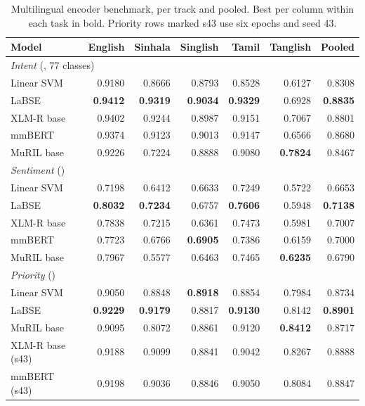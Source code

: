 \begin{table}[!htbp]
\caption{Multilingual encoder benchmark, per track and pooled. Best per column
within each task in bold. Priority rows marked s43 use six epochs and seed 43.}
\label{tab:encoder_benchmark}
\centering
\scriptsize
\setlength{\tabcolsep}{3.2pt}
\begin{tabular}{@{}lrrrrrr@{}}
\toprule
Model & English & Sinhala & Singlish & Tamil & Tanglish & Pooled \\
\midrule
\multicolumn{7}{l}{\textit{Intent} (\macrof{}, 77 classes)} \\
Linear SVM & 0.9180 & 0.8666 & 0.8793 & 0.8528 & 0.6127 & 0.8308 \\
LaBSE      & \textbf{0.9412} & \textbf{0.9319} & \textbf{0.9034} & \textbf{0.9329} & 0.6928 & \textbf{0.8835} \\
XLM-R base & 0.9402 & 0.9244 & 0.8987 & 0.9151 & 0.7067 & 0.8801 \\
mmBERT     & 0.9374 & 0.9123 & 0.9013 & 0.9147 & 0.6566 & 0.8680 \\
MuRIL base & 0.9226 & 0.7224 & 0.8888 & 0.9080 & \textbf{0.7824} & 0.8467 \\
\midrule
\multicolumn{7}{l}{\textit{Sentiment} (\negf{})} \\
Linear SVM & 0.7198 & 0.6412 & 0.6633 & 0.7249 & 0.5722 & 0.6653 \\
LaBSE      & \textbf{0.8032} & \textbf{0.7234} & 0.6757 & \textbf{0.7606} & 0.5948 & \textbf{0.7138} \\
XLM-R base & 0.7838 & 0.7215 & 0.6361 & 0.7473 & 0.5981 & 0.7007 \\
mmBERT     & 0.7723 & 0.6766 & \textbf{0.6905} & 0.7386 & 0.6159 & 0.7000 \\
MuRIL base & 0.7967 & 0.5577 & 0.6463 & 0.7465 & \textbf{0.6235} & 0.6790 \\
\midrule
\multicolumn{7}{l}{\textit{Priority} (\macrof{})} \\
Linear SVM & 0.9050 & 0.8848 & \textbf{0.8918} & 0.8854 & 0.7984 & 0.8734 \\
LaBSE      & \textbf{0.9229} & \textbf{0.9179} & 0.8817 & \textbf{0.9130} & 0.8142 & \textbf{0.8901} \\
MuRIL base & 0.9095 & 0.8072 & 0.8861 & 0.9120 & \textbf{0.8412} & 0.8717 \\
XLM-R base (s43) & 0.9188 & 0.9099 & 0.8841 & 0.9042 & 0.8267 & 0.8888 \\
mmBERT (s43) & 0.9198 & 0.9036 & 0.8846 & 0.9050 & 0.8084 & 0.8847 \\
\bottomrule
\end{tabular}
\end{table}
